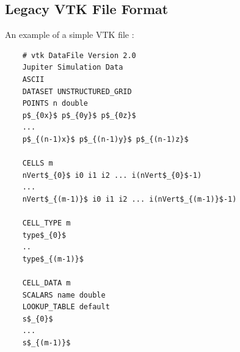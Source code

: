 \documentclass[preprint2]{aastex62}
\begin{document}
\begin{appendix}
	\section{Legacy VTK File Format}
	An example of a simple VTK file \cite{Formats2009}:
	\begin{lstlisting}
	# vtk DataFile Version 2.0
	Jupiter Simulation Data
	ASCII
	DATASET UNSTRUCTURED_GRID
	POINTS n double
	p$_{0x}$ p$_{0y}$ p$_{0z}$
	...
	p$_{(n-1)x}$ p$_{(n-1)y}$ p$_{(n-1)z}$
	
	CELLS m 
	nVert$_{0}$ i0 i1 i2 ... i(nVert$_{0}$-1)
	...
	nVert$_{(m-1)}$ i0 i1 i2 ... i(nVert$_{(m-1)}$-1)
	
	CELL_TYPE m 
	type$_{0}$
	..
	type$_{(m-1)}$
	
	CELL_DATA m
	SCALARS name double
	LOOKUP_TABLE default
	s$_{0}$
	...
	s$_{(m-1)}$
	\end{lstlisting}
\end{appendix}
\end{document}
